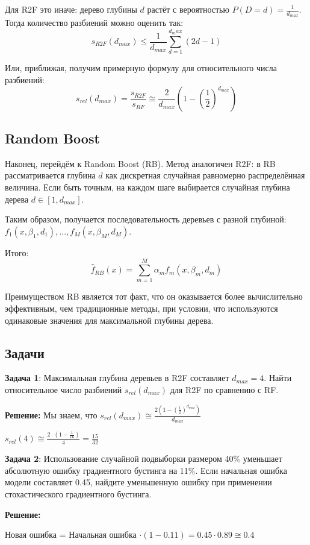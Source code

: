 Для R2F это иначе: дерево глубины $d$ растёт с вероятностью $P(D=d) = \frac{1}{d_{max}}$. Тогда количество разбиений можно оценить так:
$$s_{R2F}(d_{max})\leq\frac{1}{d_{max}} \sum_{d=1}^{d_max}\left(2d-1\right)$$

Или, приближая, получим примерную формулу для относительного числа разбиений:
$$s_{rel}(d_{max}) = \frac{s_{R2F}}{s_{RF}} \cong \frac{2}{d_{max}} \left(1 - \left(\frac{1}{2}\right)^{d_{max}}\right)$$

\subsection*{Random Boost}
Наконец, перейдём к Random Boost (RB). Метод аналогичен R2F: в RB рассматривается глубина $d$ как дискретная случайная равномерно распределённая величина. Если быть точным, на каждом шаге выбирается случайная глубина дерева $d \in [1, d_{max}]$.

Таким образом, получается последовательность деревьев с разной глубиной: $f_1(x, \beta_1, d_1),...,f_M(x, \beta_M, d_M)$.

Итого:
$$\hat{f}_{RB}(x)=\sum_{m=1}^M \alpha_m f_m(x, \beta_m, d_m)$$

Преимуществом RB является тот факт, что он оказывается более вычислительно эффективным, чем традиционные методы, при условии, что используются одинаковые значения для максимальной глубины дерева.

\subsection*{Задачи}

\textbf{Задача 1}:
Максимальная глубина деревьев в R2F составляет $d_{max} = 4$. Найти относительное число разбиений $s_{rel}(d_{max})$ для R2F по сравнению с RF.

\textbf{Решение:}
Мы знаем, что $s_{rel}(d_{max})\cong\frac{2 \left(1-\left(\frac{1}{2}\right)^{d_{max}}\right)}{d_{max}}$

$s_{rel}(4) \cong \frac{2 \cdot (1 - \frac{1}{16})}{4} = \frac{15}{32}$

\textbf{Задача 2}:
Использование случайной подвыборки размером 40\% уменьшает абсолютную ошибку градиентного бустинга на 11\%. Если начальная ошибка модели составляет 0.45, найдите уменьшенную ошибку при применении стохастического градиентного бустинга.

\textbf{Решение:}
\begin{center}    
Новая ошибка = Начальная ошибка $\cdot (1 - 0.11) = 0.45 \cdot 0.89 \cong 0.4$
\end{center}

